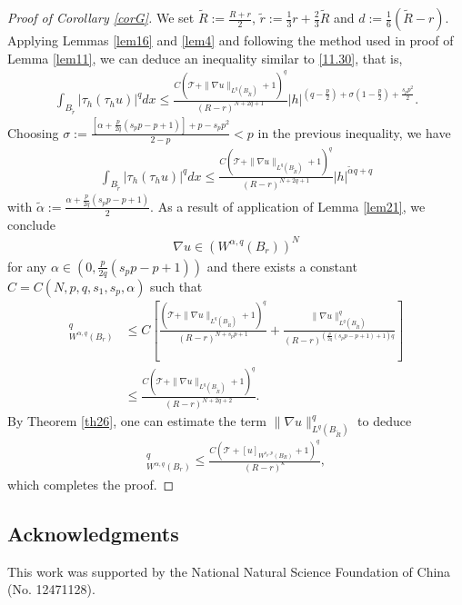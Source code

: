 \documentclass[reqno,10pt]{amsart}
\numberwithin{equation}{section}
\begin{document}
\begin{proof}[Proof of Corollary \ref{corG}]
	We set $\widetilde{R}:=\frac{R+r}{2}$, $\tilde{r}:=\frac{1}{3}r+\frac{2}{3}\widetilde{R}$ and $d:=\frac{1}{6}(\widetilde{R}-r)$. Applying Lemmas \ref{lem16} and \ref{lem4} and following the method used in proof of Lemma \ref{lem11}, we can deduce  an inequality similar to \eqref{11.30}, that is,
	\begin{align*}
		\int_{B_{\tilde{r}}}\left|\tau_h\left(\tau_h u\right)\right|^q d x \leq \frac{C\left(\mathcal{T}+\|\nabla u\|_{L^q(B_{\widetilde{R}})}+1\right)^q}{(R-r)^{N+2q+1}}|h|^{\left(q-\frac{p}{2}\right)+\sigma\left(1-\frac{p}{2}\right)+\frac{s_p p^2}{2}}.
	\end{align*}
	Choosing $\sigma:=\frac{\left[\alpha+\frac{p}{2q}(s_pp-p+1)\right]+p-s_pp^2}{2-p}<p$ in the previous inequality, we have
	\begin{align*}
		\int_{B_{\tilde{r}}}\left|\tau_h\left(\tau_h u\right)\right|^q d x \leq \frac{C\left(\mathcal{T}+\|\nabla u\|_{L^q(B_{\widetilde{R}})}+1\right)^q}{(R-r)^{N+2q+1}}|h|^{\tilde{\alpha}q+q}
	\end{align*}
	with $\tilde{\alpha}:=\frac{\alpha+\frac{p}{2q}(s_pp-p+1)}{2}$. As a result of application of Lemma \ref{lem21}, we conclude
	\begin{align*}
		\nabla u\in \left( W^{\alpha,q}(B_r)\right)^N 
	\end{align*}
	for any $\alpha\in \left( 0,\frac{p}{2q}(s_pp-p+1)\right) $ and there exists a constant $C=C(N, p, q, s_1, s_p, \alpha)$ such that
	\begin{align*}
		[\nabla u]^{q}_{W^{\alpha,q}(B_r)}&\le C\left[ \frac{\left( \mathcal{T}+\|\nabla u\|_{L^q(B_{\widetilde{R}})}+1\right)^q}{(R-r)^{N+s_pp+1}}+\frac{\|\nabla u\|^q_{L^q(B_{\widetilde{R}})}}{(R-r)^{\left( \frac{p}{2q}(s_pp-p+1)+1\right) q}}\right] \\
		&\le \frac{C\left( \mathcal{T}+\|\nabla u\|_{L^q(B_{\widetilde{R}})}+1\right)^q}{(R-r)^{N+2q+2}}.
	\end{align*}
	By Theorem \ref{th26}, one can estimate the term $\|\nabla u\|^q_{L^q(B_{\widetilde{R}})}$ to deduce
	\begin{align*}
		[\nabla u]^{q}_{W^{\alpha,q}(B_r)}\le \frac{C\left( \mathcal{T}+[u]_{W^{s_p,p}(B_R)}+1\right)^q}{(R-r)^{\kappa}},
	\end{align*}
which completes the proof.
\end{proof}



\subsection*{Acknowledgments}
This work was supported by the National Natural Science Foundation of China (No. 12471128).
\end{document}

